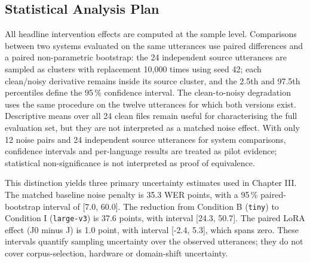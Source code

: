 \documentclass[12pt]{report}
\begin{document}
\subsection{Statistical Analysis Plan}
All headline intervention effects are computed at the sample level. Comparisons between two systems evaluated on the same utterances use paired differences and a paired non-parametric bootstrap: the 24 independent source utterances are sampled as clusters with replacement 10{,}000 times using seed 42; each clean/noisy derivative remains inside its source cluster, and the 2.5th and 97.5th percentiles define the 95\,\% confidence interval. The clean-to-noisy degradation uses the same procedure on the twelve utterances for which both versions exist. Descriptive means over all 24 clean files remain useful for characterising the full evaluation set, but they are not interpreted as a matched noise effect. With only 12 noise pairs and 24 independent source utterances for system comparisons, confidence intervals and per-language results are treated as pilot evidence; statistical non-significance is not interpreted as proof of equivalence.

This distinction yields three primary uncertainty estimates used in Chapter III. The matched baseline noise penalty is 35.3 WER points, with a 95\,\% paired-bootstrap interval of [7.0, 60.0]. The reduction from Condition B (\texttt{tiny}) to Condition I (\texttt{large-v3}) is 37.6 points, with interval [24.3, 50.7]. The paired LoRA effect (J0 minus J) is 1.0 point, with interval [-2.4, 5.3], which spans zero. These intervals quantify sampling uncertainty over the observed utterances; they do not cover corpus-selection, hardware or domain-shift uncertainty.
\end{document}
